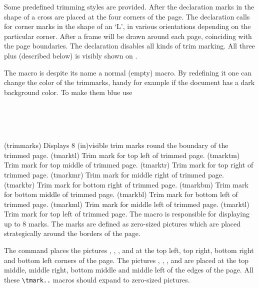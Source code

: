Some predefined trimming styles are provided. After the declaration
\cmd{\trimXmarks} marks in the shape of a cross are placed at the four
corners of the page. The declaration \cmd{\trimLmarks} calls for corner marks
in the shape of an `L', in various orientations depending on the particular
corner. After \cmd{\trimFrame} a frame will be drawn around each page, 
coinciding with the page boundaries. The declaration \cmd{\trimNone}
disables all kinds of trim marking. All three plus 
(described below) is visibly shown on .

The macro  is despite its name a normal (empty)
macro. By redefining it one can change the color of the trimmarks,
handy for example if the document has a dark background color. To make
them blue use
\begin{lcode}
\newcommand*{\trimmarkscolor}{\color{blue}}
\end{lcode}


\begin{syntax}
\cmd{\trimmarks} \\
\cmd{\tmarktl} \cmd{\tmarktr} \cmd{\tmarkbr} \cmd{\tmarkbl} \\
\cmd{\tmarktm} \cmd{\tmarkmr} \cmd{\tmarkbm} \cmd{\tmarkml} \\
\end{syntax}
\glossary(trimmarks)%
  {}%
  {Displays 8 (in)visible trim marks round the boundary of the trimmed page.}
\glossary(tmarktl)%
  {}%
  {Trim mark for top left of trimmed page.}
\glossary(tmarktm)%
  {}%
  {Trim mark for top middle of trimmed page.}
\glossary(tmarktr)%
  {}%
  {Trim mark for top right of trimmed page.}
\glossary(tmarkmr)%
  {}%
  {Trim mark for middle right of trimmed page.}
\glossary(tmarkbr)%
  {}%
  {Trim mark for bottom right of trimmed page.}
\glossary(tmarkbm)%
  {}%
  {Trim mark for bottom middle of trimmed page.}
\glossary(tmarkbl)%
  {}%
  {Trim mark for bottom left of trimmed page.}
\glossary(tmarkml)%
  {}%
  {Trim mark for middle left of trimmed page.}
\glossary(tmarktl)%
  {}%
  {Trim mark for top left of trimmed page.}
The \cmd{\trimmarks} macro is responsible for displaying up to 8 marks. The
marks are defined as zero-sized pictures which are placed strategically
around the borders of the page. 

    The command \cmd{\trimmarks} places the pictures \cmd{\tmarktl}, 
\cmd{\tmarktr},
\cmd{\tmarkbl}, and \cmd{\tmarkbr} at the top left, top right,
bottom right and bottom left corners of the page. The pictures
\cmd{\tmarktm}, \cmd{\tmarkmr}, \cmd{\tmarkbm}, and \cmd{\tmarkml} are placed
at the top middle, middle right, bottom middle and middle left of the
edges of the page. All these \verb?\tmark..? macros should expand to zero-sized
pictures.


